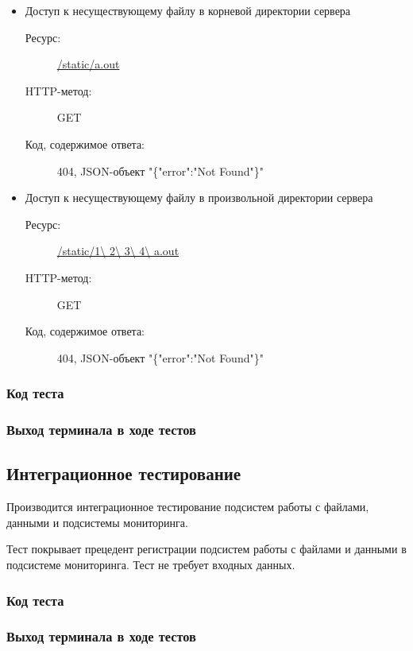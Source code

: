 \documentclass[a4paper,12pt]{report}
\numberwithin{equation}{section}
\begin{document}
\begin{itemize}
  \item Доступ к несуществующему файлу в корневой директории сервера
  \begin{description}
    \item[Ресурс:] \url{/static/a.out}
    \item[HTTP-метод:] GET
    \item[Код, содержимое ответа:] 404, JSON-объект "\{"error":"Not Found"\}"
  \end{description}
  
  \item Доступ к несуществующему файлу в произвольной директории сервера
  \begin{description}
    \item[Ресурс:] \url{/static/1\ 2\ 3\ 4\ a.out}
    \item[HTTP-метод:] GET
    \item[Код, содержимое ответа:] 404, JSON-объект "\{"error":"Not Found"\}"
  \end{description}
\end{itemize}

\subsubsection{Код теста}


\subsubsection{Выход терминала в ходе тестов}



\subsection{Интеграционное тестирование}
Производится интеграционное тестирование подсистем работы с файлами, данными и подсистемы мониторинга.


Тест покрывает прецедент регистрации подсистем работы с файлами и данными в подсистеме мониторинга.
Тест не требует входных данных.


\subsubsection{Код теста}


\subsubsection{Выход терминала в ходе тестов}

\end{document}
